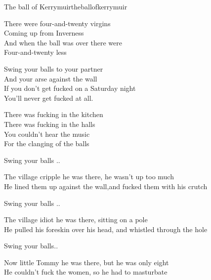 \begin{song}{The ball of Kerrymuir}{theballofkerrymuir}
\begin{vers}
There were four-and-twenty virgins\\
Coming up from Inverness\\
And when the ball was over there were\\
Four-and-twenty less\\
\end{vers}
\begin{vers}
Swing your balls to your partner\\
And your arse against the wall\\
If you don't get fucked on a Saturday night\\
You'll never get fucked at all.
\end{vers}
\begin{vers}
There was fucking in the kitchen\\
There was fucking in the halls\\
You couldn't hear the music\\
For the clanging of the balls\\
\end{vers}
\begin{vers}
Swing your balls ..\\
\end{vers}
\begin{vers}
The village cripple he was there, he wasn't up too much\\
He lined them up against the wall,and fucked them with his crutch\\
\end{vers}
\begin{vers}
Swing your balls ..\\
\end{vers}
\begin{vers}
The village idiot he was there, sitting on a pole\\
He pulled his foreskin over his head, and whistled through the hole\\
\end{vers}
\begin{vers}
Swing your balls..\\
\end{vers}
\begin{vers}
Now little Tommy he was there, but he was only eight\\
He couldn't fuck the women, so he had to masturbate\\

\end{vers}
\end{song}
